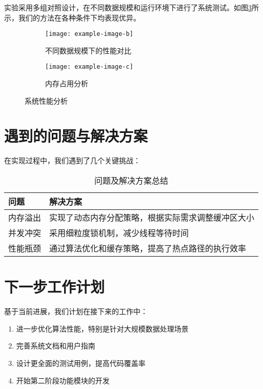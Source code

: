 \documentclass{article}
\begin{document}
实验采用多组对照设计，在不同数据规模和运行环境下进行了系统测试。如图\ref{fig:performance_comparison}所示，我们的方法在各种条件下均表现优异。

\begin{figure}[h]
  \centering
  \begin{subfigure}{0.48\textwidth}
    \centering
    \texttt{[image: example-image-b]}
    \caption{不同数据规模下的性能对比}
    \label{fig:scale_performance}
  \end{subfigure}
  \hfill
  \begin{subfigure}{0.48\textwidth}
    \centering
    \texttt{[image: example-image-c]}
    \caption{内存占用分析}
    \label{fig:memory_usage}
  \end{subfigure}
  \caption{系统性能分析}
  \label{fig:performance_comparison}
\end{figure}

\section{遇到的问题与解决方案}

在实现过程中，我们遇到了几个关键挑战：

\begin{table}[h]
  \centering
  \begin{tabular}{|p{}|p{}|}
    \hline
    \textbf{问题} & \textbf{解决方案} \\
    \hline
    内存溢出 & 实现了动态内存分配策略，根据实际需求调整缓冲区大小 \\
    \hline
    并发冲突 & 采用细粒度锁机制，减少线程等待时间 \\
    \hline
    性能瓶颈 & 通过算法优化和缓存策略，提高了热点路径的执行效率 \\
    \hline
  \end{tabular}
  \caption{问题及解决方案总结}
  \label{tab:problems_solutions}
\end{table}

\section{下一步工作计划}

基于当前进展，我们计划在接下来的工作中：

\begin{enumerate}
  \item 进一步优化算法性能，特别是针对大规模数据处理场景
  \item 完善系统文档和用户指南
  \item 设计更全面的测试用例，提高代码覆盖率
  \item 开始第二阶段功能模块的开发
\end{enumerate}



\end{document}
